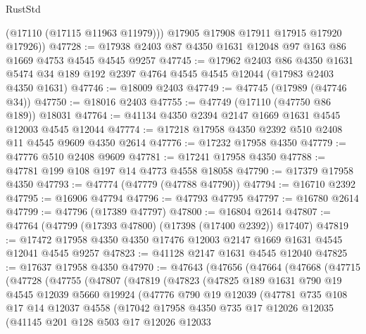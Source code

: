 \begin{lexlean}{RustStd}
\begin{coremodule}
          (@17110 (@17115 @11963 @11979)))
        @17905
        @17908
        @17911
        @17915
        @17920
        @17926))
@47728 := @17938 @2403 @87 @4350 @1631 @12048 @97 @163 @86 @1669 @4753 @4545 @4545 @9257
@47745 := @17962
    @2403
    @86
    @4350
    @1631
    @5474
    @34
    @189
    @192
    @2397
    @4764
    @4545
    @4545
    @12044
    (@17983 @2403 @4350 @1631)
@47746 := @18009 @2403
@47749 := @47745 (@17989 (@47746 @34))
@47750 := @18016 @2403
@47755 := @47749 (@17110 (@47750 @86 @189)) @18031
@47764 := @41134 @4350 @2394 @2147 @1669 @1631 @4545 @12003 @4545 @12044
@47774 := @17218 @17958 @4350 @2392 @510 @2408 @11 @4545 @9609 @4350 @2614
@47776 := @17232 @17958 @4350
@47779 := @47776 @510 @2408 @9609
@47781 := @17241 @17958 @4350
@47788 := @47781 @199 @108 @197 @14 @4773 @4558 @18058
@47790 := @17379 @17958 @4350
@47793 := @47774 (@47779 (@47788 @47790))
@47794 := @16710 @2392
@47795 := @16906 @47794
@47796 := @47793 @47795
@47797 := @16780 @2614
@47799 := @47796 (@17389 @47797)
@47800 := @16804 @2614
@47807 := @47764 (@47799 (@17393 @47800) (@17398 (@17400 @2392)) @17407)
@47819 := @17472 @17958 @4350 @4350 @17476 @12003 @2147 @1669 @1631 @4545 @12041 @4545 @9257
@47823 := @41128 @2147 @1631 @4545 @12040
@47825 := @17637 @17958 @4350
@47970 := @47643
    (@47656
      (@47664
        (@47668
          (@47715
            (@47728
              (@47755
                (@47807
                  (@47819
                    (@47823
                      (@47825
                        @189
                        @1631
                        @790
                        @19
                        @4545
                        @12039
                        @5660
                        @19924
                        (@47776
                          @790
                          @19
                          @12039
                          (@47781
                            @735
                            @108
                            @17
                            @14
                            @12037
                            @4558
                            (@17042
                              @17958
                              @4350
                              @735
                              @17
                              @12026
                              @12035
                              (@41145
                                @201
                                @128
                                @503
                                @17
                                @12026
                                @12033

\end{coremodule}
\end{lexlean}
